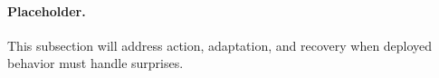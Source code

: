 \paragraph{Placeholder.}
This subsection will address action, adaptation, and recovery when deployed behavior must handle surprises.
